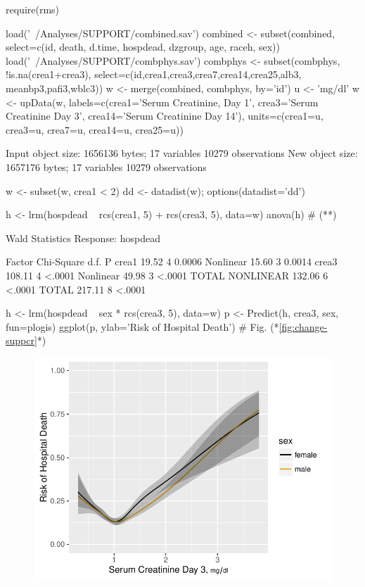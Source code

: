 \begin{Schunk}
\begin{Sinput}
require(rms)
\end{Sinput}
\begin{Sinput}
load('~/Analyses/SUPPORT/combined.sav')
combined <- subset(combined,
  select=c(id, death, d.time, hospdead, dzgroup, age, raceh, sex))
load('~/Analyses/SUPPORT/combphys.sav')
combphys <- subset(combphys, !is.na(crea1+crea3),
                   select=c(id,crea1,crea3,crea7,crea14,crea25,alb3,
                     meanbp3,pafi3,wblc3))
w <- merge(combined, combphys, by='id')
u <- 'mg/dl'
w <- upData(w, labels=c(crea1='Serum Creatinine, Day 1',
                 crea3='Serum Creatinine Day 3',
                 crea14='Serum Creatinine Day 14'),
            units=c(crea1=u, crea3=u, crea7=u, crea14=u, crea25=u))
\end{Sinput}
\begin{Soutput}
Input object size:	 1656136 bytes;	 17 variables	 10279 observations
New object size:	 1657176 bytes;	 17 variables	 10279 observations
\end{Soutput}
\begin{Sinput}
w <- subset(w, crea1 < 2)
dd <- datadist(w); options(datadist='dd')

h <- lrm(hospdead ~ rcs(crea1, 5) + rcs(crea3, 5), data=w)
anova(h)   # (*\label{pg:change-anova}*)
\end{Sinput}
\begin{Soutput}
                Wald Statistics          Response: hospdead 

 Factor          Chi-Square d.f. P     
 crea1            19.52     4    0.0006
  Nonlinear       15.60     3    0.0014
 crea3           108.11     4    <.0001
  Nonlinear       49.98     3    <.0001
 TOTAL NONLINEAR 132.06     6    <.0001
 TOTAL           217.11     8    <.0001
\end{Soutput}
\begin{Sinput}
h <- lrm(hospdead ~ sex * rcs(crea3, 5), data=w)
p <- Predict(h, crea3, sex, fun=plogis)
ggplot(p, ylab='Risk of Hospital Death')    # Fig. (*\ref{fig:change-suppcr}*)
\end{Sinput}
\begin{figure}[htbp]

\centerline{\includegraphics{change-suppcr-1} }


\end{figure}
\end{Schunk}
